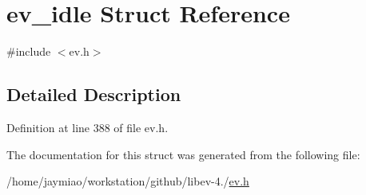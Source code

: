 \hypertarget{structev__idle}{\section{ev\-\_\-idle \-Struct \-Reference}
\label{structev__idle}
}


{\ttfamily \#include $<$ev.\-h$>$}



\subsection{\-Detailed \-Description}


\-Definition at line 388 of file ev.\-h.



\-The documentation for this struct was generated from the following file\-:\begin{DoxyCompactItemize}
\item 
/home/jaymiao/workstation/github/libev-\/4./\hyperlink{ev_8h}{ev.\-h}\end{DoxyCompactItemize}
